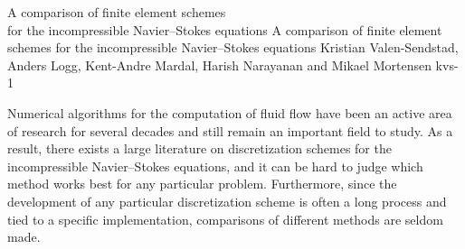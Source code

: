 \begingroup

\setcounter{chapter}{20}
\setcounter{chpnum}{20}

              {A comparison of finite element schemes\\ for the incompressible
                 Navier--Stokes equations}
              {A comparison of finite element schemes for the incompressible
                 Navier--Stokes equations}
              {Kristian Valen-Sendstad, Anders Logg, Kent-Andre Mardal,
               Harish Narayanan and Mikael Mortensen}
              {kvs-1}


\newcommand{\css}[1]{$\mathrm{CSS}_{#1}$}

\newcommand{\scheme}[3]{%
\begin{figure}
  \center
    \small
    \begin{tabular}{l}
      \toprule
      \textbf{Scheme #1:} #2 \\
      \midrule
  \begin{minipage}{.93\textwidth}
        \vspace{0.1cm}
        \begin{enumerate}
          #3
        \end{enumerate}
        \vspace{0.1cm}
      \end{minipage} \\
      \bottomrule
    \end{tabular}
    \normalsize
\end{figure}}


Numerical algorithms for the computation of fluid flow have been an
active area of research for several decades and still remain an
important field to study. As a result, there exists a large literature
on discretization schemes for the incompressible Navier--Stokes
equations, and it can be hard to judge which method works best for any
particular problem. Furthermore, since the development of any
particular discretization scheme is often a long process and tied to a
specific implementation, comparisons of different methods are seldom
made.

